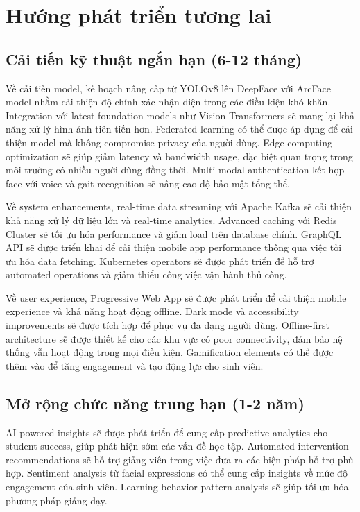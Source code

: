 \documentclass[12pt,a4paper]{report}
\begin{document}
\section{Hướng phát triển tương lai}
\subsection{Cải tiến kỹ thuật ngắn hạn (6-12 tháng)}
Về cải tiến model, kế hoạch nâng cấp từ YOLOv8 lên DeepFace với ArcFace model nhằm cải thiện độ chính xác nhận diện trong các điều kiện khó khăn. Integration với latest foundation models như Vision Transformers sẽ mang lại khả năng xử lý hình ảnh tiên tiến hơn. Federated learning có thể được áp dụng để cải thiện model mà không compromise privacy của người dùng. Edge computing optimization sẽ giúp giảm latency và bandwidth usage, đặc biệt quan trọng trong môi trường có nhiều người dùng đồng thời. Multi-modal authentication kết hợp face với voice và gait recognition sẽ nâng cao độ bảo mật tổng thể.

Về system enhancements, real-time data streaming với Apache Kafka sẽ cải thiện khả năng xử lý dữ liệu lớn và real-time analytics. Advanced caching với Redis Cluster sẽ tối ưu hóa performance và giảm load trên database chính. GraphQL API sẽ được triển khai để cải thiện mobile app performance thông qua việc tối ưu hóa data fetching. Kubernetes operators sẽ được phát triển để hỗ trợ automated operations và giảm thiểu công việc vận hành thủ công.

Về user experience, Progressive Web App sẽ được phát triển để cải thiện mobile experience và khả năng hoạt động offline. Dark mode và accessibility improvements sẽ được tích hợp để phục vụ đa dạng người dùng. Offline-first architecture sẽ được thiết kế cho các khu vực có poor connectivity, đảm bảo hệ thống vẫn hoạt động trong mọi điều kiện. Gamification elements có thể được thêm vào để tăng engagement và tạo động lực cho sinh viên.

\subsection{Mở rộng chức năng trung hạn (1-2 năm)}
AI-powered insights sẽ được phát triển để cung cấp predictive analytics cho student success, giúp phát hiện sớm các vấn đề học tập. Automated intervention recommendations sẽ hỗ trợ giảng viên trong việc đưa ra các biện pháp hỗ trợ phù hợp. Sentiment analysis từ facial expressions có thể cung cấp insights về mức độ engagement của sinh viên. Learning behavior pattern analysis sẽ giúp tối ưu hóa phương pháp giảng dạy.
\end{document}
